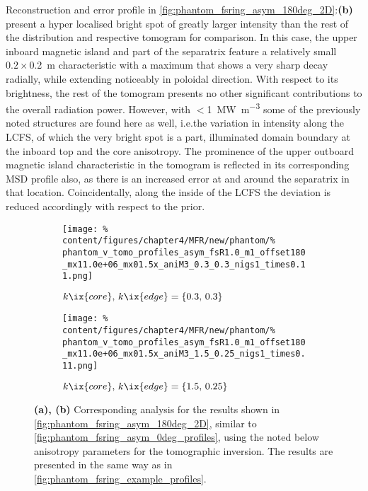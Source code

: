                 Reconstruction and error profile in \cref{fig:phantom_fsring_asym_180deg_2D}:\textbf{(b)} present a hyper localised bright spot of greatly larger intensity than the rest of the distribution and respective tomogram for comparison. In this case, the upper inboard magnetic island and part of the separatrix feature a relatively small $0.2\times$\SI{0.2}{\meter} characteristic with a maximum that shows a very sharp decay radially, while extending noticeably in poloidal direction. With respect to its brightness, the rest of the tomogram presents no other significant contributions to the overall radiation power. However, with $<$\SI{1}{\mega\watt\per\cubic\meter} some of the previously noted structures are found here as well, i.e.the variation in intensity along the LCFS, of which the very bright spot is a part, illuminated domain boundary at the inboard top and the core anisotropy. The prominence of the upper outboard magnetic island characteristic in the tomogram is reflected in its corresponding MSD profile also, as there is an increased error at and around the separatrix in that location. Coincidentally, along the inside of the LCFS the deviation is reduced accordingly with respect to the prior.\\%
%
                \begin{figure}[t]%
                    \centering%
                    \begin{subfigure}{\textwidth}%
                        \centering%
                        \texttt{[image: \%
                            content/figures/chapter4/MFR/new/phantom/\%
                            phantom\_v\_tomo\_profiles\_asym\_fsR1.0\_m1\_offset180\_mx11.0e+06\_mx01.5x\_aniM3\_0.3\_0.3\_nigs1\_times0.11.png]}%
                        \caption{$k\ix{core},\,k\ix{edge}=\left\{0.3,\,0.3\right\}$}%
                    \end{subfigure}%
                    \newline%
                    \begin{subfigure}{\textwidth}%
                        \centering%
                        \texttt{[image: \%
                            content/figures/chapter4/MFR/new/phantom/\%
                            phantom\_v\_tomo\_profiles\_asym\_fsR1.0\_m1\_offset180\_mx11.0e+06\_mx01.5x\_aniM3\_1.5\_0.25\_nigs1\_times0.11.png]}%
                        \caption{$k\ix{core},\,k\ix{edge}=\left\{1.5,\,0.25\right\}$}%
                    \end{subfigure}%
                    \caption{\textbf{(a), (b)} Corresponding analysis for the results shown in \cref{fig:phantom_fsring_asym_180deg_2D}, similar to \cref{fig:phantom_fsring_asym_0deg_profiles}, using the noted below anisotropy parameters for the tomographic inversion. The results are presented in the same way as in \cref{fig:phantom_fsring_example_profiles}.}\label{fig:phantom_fsring_asym_180deg_profiles}%
                \end{figure}%

